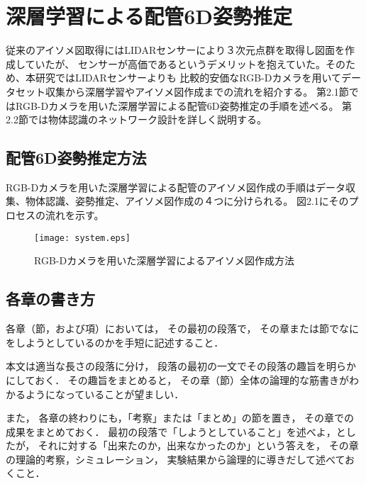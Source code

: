 \chapter{%
深層学習による配管6D姿勢推定}

従来のアイソメ図取得にはLIDARセンサーにより３次元点群を取得し図面を作成していたが、
センサーが高価であるというデメリットを抱えていた。そのため、本研究ではLIDARセンサーよりも
比較的安価なRGB-Dカメラを用いてデータセット収集から深層学習やアイソメ図作成までの流れを紹介する。
第2.1節ではRGB-Dカメラを用いた深層学習による配管6D姿勢推定の手順を述べる。
第2.2節では物体認識のネットワーク設計を詳しく説明する。


\section{配管6D姿勢推定方法}
RGB-Dカメラを用いた深層学習による配管のアイソメ図作成の手順はデータ収集、物体認識、姿勢推定、アイソメ図作成の４つに分けられる。
図2.1にそのプロセスの流れを示す。

\begin{figure}[htbt]
	\centering
	 \texttt{[image: system.eps]}
	 \caption{RGB-Dカメラを用いた深層学習によるアイソメ図作成方法}
	 \label{fig:f2}
\end{figure}



\section{各章の書き方}

各章（節，および項）においては，
その最初の段落で，
その章または節でなにをしようとしているのかを手短に記述すること．

本文は適当な長さの段落に分け，
段落の最初の一文でその段落の趣旨を明らかにしておく．
その趣旨をまとめると，
その章（節）全体の論理的な筋書きがわかるようになっていることが望ましい．

また，
各章の終わりにも，「考察」または「まとめ」の節を置き，
その章での成果をまとめておく．
最初の段落で「しようとしていること」を述べよ，としたが，
それに対する「出来たのか，出来なかったのか」という答えを，
その章の理論的考察，シミュレーション，
実験結果から論理的に導きだして述べておくこと．
